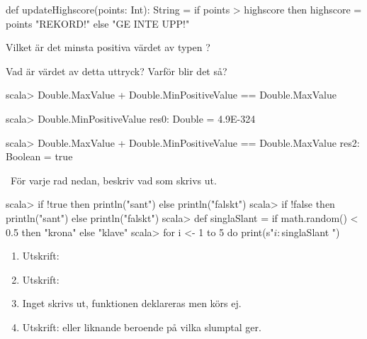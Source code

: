 \SubtaskSolved
\begin{Code}
def updateHighscore(points: Int): String =
  if points > highscore then
    highscore = points
    "REKORD!"
  else "GE INTE UPP!"
\end{Code}



\QUESTEND



\QUESTBEGIN

\Task \what

\Subtask Vilket är det minsta positiva värdet av typen ?

\Subtask Vad är värdet av detta uttryck? Varför blir det så?
\begin{REPL}
scala> Double.MaxValue + Double.MinPositiveValue == Double.MaxValue
\end{REPL}

\SOLUTION

\TaskSolved \what

\SubtaskSolved

\begin{REPL}
scala> Double.MinPositiveValue
res0: Double = 4.9E-324
\end{REPL}

\SubtaskSolved

\begin{REPL}
scala> Double.MaxValue + Double.MinPositiveValue == Double.MaxValue
res2: Boolean = true
\end{REPL}

\QUESTEND




\QUESTBEGIN

\Task \what~För varje rad nedan, beskriv vad som skrivs ut.  %
\begin{REPL}
scala> if !true then println("sant") else println("falskt")
scala> if !false then println("sant") else println("falskt")
scala> def singlaSlant = if math.random() < 0.5 then "krona" else "klave"
scala> for i <- 1 to 5 do print(s"$i:$singlaSlant ")
\end{REPL}

\SOLUTION

\TaskSolved \what

\begin{enumerate}
\item Utskrift: 
\item Utskrift: 
\item Inget skrivs ut, funktionen deklareras men körs ej.
\item Utskrift:  eller liknande beroende på vilka slumptal  ger.
\end{enumerate}

